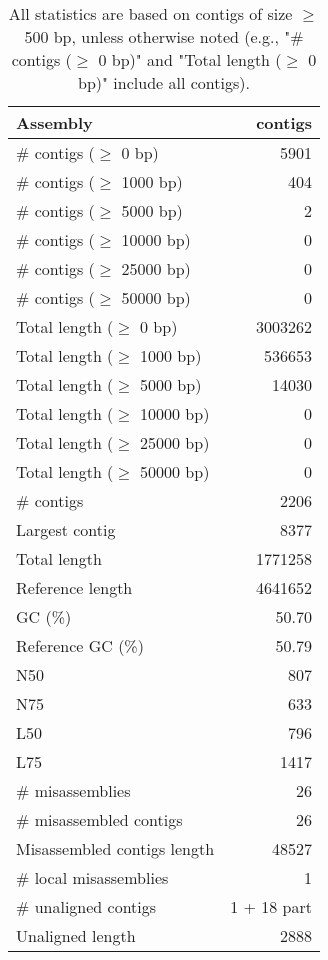 \documentclass[12pt,a4paper]{article}
\begin{document}
\begin{table}[ht]
\begin{center}
\caption{All statistics are based on contigs of size $\geq$ 500 bp, unless otherwise noted (e.g., "\# contigs ($\geq$ 0 bp)" and "Total length ($\geq$ 0 bp)" include all contigs).}
\begin{tabular}{|l*{1}{|r}|}
\hline
Assembly & contigs \\ \hline
\# contigs ($\geq$ 0 bp) & 5901 \\ \hline
\# contigs ($\geq$ 1000 bp) & 404 \\ \hline
\# contigs ($\geq$ 5000 bp) & 2 \\ \hline
\# contigs ($\geq$ 10000 bp) & 0 \\ \hline
\# contigs ($\geq$ 25000 bp) & 0 \\ \hline
\# contigs ($\geq$ 50000 bp) & 0 \\ \hline
Total length ($\geq$ 0 bp) & 3003262 \\ \hline
Total length ($\geq$ 1000 bp) & 536653 \\ \hline
Total length ($\geq$ 5000 bp) & 14030 \\ \hline
Total length ($\geq$ 10000 bp) & 0 \\ \hline
Total length ($\geq$ 25000 bp) & 0 \\ \hline
Total length ($\geq$ 50000 bp) & 0 \\ \hline
\# contigs & 2206 \\ \hline
Largest contig & 8377 \\ \hline
Total length & 1771258 \\ \hline
Reference length & 4641652 \\ \hline
GC (\%) & 50.70 \\ \hline
Reference GC (\%) & 50.79 \\ \hline
N50 & 807 \\ \hline
N75 & 633 \\ \hline
L50 & 796 \\ \hline
L75 & 1417 \\ \hline
\# misassemblies & 26 \\ \hline
\# misassembled contigs & 26 \\ \hline
Misassembled contigs length & 48527 \\ \hline
\# local misassemblies & 1 \\ \hline
\# unaligned contigs & 1 + 18 part \\ \hline
Unaligned length & 2888 \\ \hline

\end{tabular}
\end{center}
\end{table}
\end{document}
